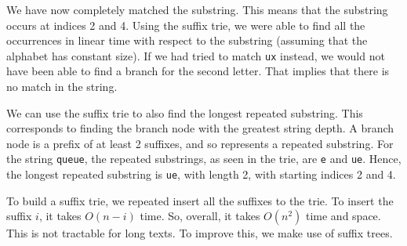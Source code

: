 \documentclass[a4paper, openany]{memoir}
\begin{document}
\begin{figure}[H]
    \end{figure}
    \noindent We have now completely matched the substring. This means that the substring occurs at indices 2 and 4. Using the suffix trie, we were able to find all the occurrences in linear time with respect to the substring (assuming that the alphabet has constant size). If we had tried to match \texttt{ux} instead, we would not have been able to find a branch for the second letter. That implies that there is no match in the string. 

    We can use the suffix trie to also find the longest repeated substring. This corresponds to finding the branch node with the greatest string depth. A branch node is a prefix of at least 2 suffixes, and so represents a repeated substring. For the string \texttt{queue}, the repeated substrings, as seen in the trie, are \texttt{e} and \texttt{ue}. Hence, the longest repeated substring is \texttt{ue}, with length 2, with starting indices 2 and 4.

    To build a suffix trie, we repeated insert all the suffixes to the trie. To insert the suffix $i$, it takes $O(n-i)$ time. So, overall, it takes $O(n^2)$ time and space. This is not tractable for long texts. To improve this, we make use of suffix trees.
\end{document}
